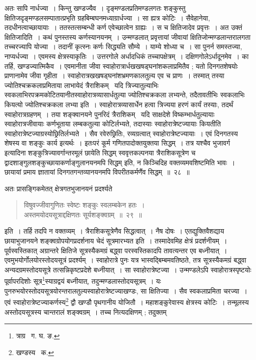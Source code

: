 \documentclass[11pt, openany]{book}
\begin{document}
\noindent अतः सापि नार्धज्या~। किन्तु खण्डज्यैव~। दृङ्मण्डलप्रतिमण्डलगतः शङ्कुस्तु क्षितिजदृङ्मण्डलसम्पातात्प्रभृति
ग्रहबिम्बघनमध्याग्रार्धज्या~। सा ह्यत्र कोटिः~। सैवेहानेया, तदधीनत्वाच्छायायाः~। ततस्तत्सम्बन्धी कर्ण एवेच्छात्वेन ग्राह्यः~। स च क्षितिजादेव प्रवृत्तः~। अत उक्तं क्षितिजादिति~। कथं पुनस्तस्य कर्णस्यानयनम्~। उन्मण्डलात् प्रवृत्तायां जीवायां क्षितिजोन्मण्डलान्तरालगता तच्चरज्यापि योज्या~। तदानीं कृत्स्नः कर्णः सिद्ध्यति सौम्ये~। याम्ये शोध्या च~। सा पुनर्न समस्तज्या, नाप्यर्धज्या~। एवमस्य क्षेत्रस्याकृतिः~। उत्तरगोले अर्धादधिकं तच्चापक्षेत्रम्~। दक्षिणगोलेऽर्धादूनमेव~। का तर्हि, खण्डज्यात्मिकैव~। एवमानीता जीवा स्वाहोरात्रार्धखखषड्घनांशकलाप्रमितैव ; यतो दिनगतशेषयोः प्राणानामेव जीवा गृहीता~। स्वाहोरात्रखखषड्घनांशभ्रमणकालतुल्य 
एव च प्राणः~। तस्मात् तस्या ज्योतिश्चक्रकलाप्रमिताया लाभायेदं त्रैराशिकम् \textendash\ यदि त्रिज्यातुल्याभिः स्वकलाभिरपक्रमकोटितयानीतस्वाहोरात्रव्यासार्धतुल्या ज्योतिश्चक्रकला लभ्यन्ते, तदैतावतीभिः स्वकलाभिः कियत्यो ज्योतिश्चक्रकला लभ्या इति~। स्वाहोरात्रव्यासार्धेन हत्वा त्रिज्यया हरणं कार्यं तस्याः, तदर्थं स्वाहोरात्रग्रहणम्~। तया शङ्क्वानयने पुनरिदं त्रैराशिकम् \textendash\ यदि साक्षदेशे विष्कम्भार्धतुल्यायाः स्वाहोरात्रजीवायाः कर्णभूताया लम्बकतुल्या कोटिर्लभ्यते, तदास्याः स्वाहोरात्रेष्टज्यायाः कियतीति स्वाहोरात्रेष्टज्याग्रस्योछ्रितिर्लभ्यते~। सैव रवेरुछ्रितिः, रव्यग्रत्वात् स्वाहोरात्रेष्टज्यायाः~। एवं दिनगतस्य शेषस्य वा शङ्कुः कार्य इत्यर्थः~। इतःपरं कूर्म गणितपादोक्तयुक्तया सिद्धम्~। तत्र {\qt यश्चैव भुजावर्ग} इत्यादिना शङ्कुत्रिज्यावर्गान्तरमूलं छायेति सिद्धम् स्ववृत्तकल्पनया त्रैराशिकसूत्रेण च द्वादशाङ्गुलशङ्कुच्छायाकर्णाङ्गुलानयनमपि सिद्धम् इति, न किञ्चिदिह वक्तव्यमवशिष्टमिति भावः~। छायायां प्रमाय ज्ञातायां दिनगतगन्तव्यानयनमपि विपरीतकर्मणैंव सिद्धम्~॥~२८~॥ 


\newpage

\indent अतः प्रासङ्गिकमेतत् क्षेत्रगतभुजानयनं प्रदर्श्यते\textendash  
\begin{quote}
{\ab विषुवज्जीवागुणितः स्वेष्टः शङ्कुः स्वलम्बकेन हतः~। \\
 अस्तमयोदयसूत्राद्दक्षिणतः सूर्यशङ्क्वग्रम्~॥~२९~॥} 
\end{quote}

\indent इति~। तर्हि तदपि न वक्तव्यम्~। त्रैराशिकसूत्रेणैव सिद्धत्वात्~। नैष दोषः~। एतद्युक्तिवैशद्याय छायाभुजानयने शङ्क्वग्रोपयोगप्रदर्शनाय चेदं सूत्रमारभ्यत इति~। तस्मादेवमिह क्षेत्रं प्रदर्शनीयम्~। पूर्वस्वस्तिकात् अग्रान्तरे क्षितिजे सूत्रस्यैकमग्रं बद्ध्वा परस्वस्तिकादपि तावत्यन्तर एव बध्नीयात्~। एवमुभयोर्गोलयोरस्तोदयसूत्रं प्रदर्श्यम्~। स्वाहोरात्रे पुनः यत्र भास्वद्बिम्बमवतिष्ठते, तत्र सूत्रस्यैकमग्रं बद्ध्वा अन्यदग्रमस्तोदयसूत्रे तत्सन्निकृष्टप्रदेशे बध्नीयात्~। सा स्वाहोरात्रेष्टज्या~। उन्मण्डलेऽपि स्वाहोरात्रस्पृष्टयोः पूर्वापरदिशोः सूत्र\renewcommand{\thefootnote}{१}\footnote{त्राग्र \textendash\ ग. घ. ङ.}स्याग्रद्वयं बध्नीयात्, तदुन्मण्डलास्तोदयसूत्रम्~। यः पुनरुभयोरस्तोदयसूत्रयोरन्तरालतुल्यस्वाहोरात्रेष्टज्याखण्डः, सा क्षितिज्या~। सैव स्वकलाप्रमिता चरज्या~। एवं स्वाहोरात्रेष्टज्याकर्णस्य\renewcommand{\thefootnote}{२}\footnote{खण्डस्य \textendash\ क.} द्वौ खण्डौ पृथगानीय योजितौ~। महाशङ्कुरेवास्य क्षेत्रस्य कोटिः~। तन्मूलस्य अस्तोदयसूत्रस्य चान्तरालं शङ्क्वग्रम्~। तच्च नित्यदक्षिणम् ; तदुक्तम्\textendash 
 
\end{document}

